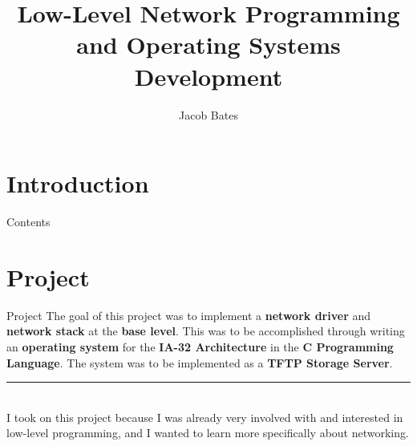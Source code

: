 \documentclass{beamer}
\title{Low-Level Network Programming and Operating Systems Development}
\author{Jacob Bates}
\institute{Da Vinci Science High School}
\begin{document}
\section{Introduction}

    \begin{frame}
        \titlepage
    \end{frame}

    \begin{frame}{Contents}
        \tableofcontents
    \end{frame}

\section{Project}

    \begin{frame}{Project}
        The goal of this project was to implement a \textbf{network driver} and \textbf{network stack} at the \textbf{base level}.
        This was to be accomplished through writing an \textbf{operating system} for the \textbf{IA-32 Architecture} in the \textbf{C Programming Language}.
        The system was to be implemented as a \textbf{TFTP Storage Server}.\\
        \rule{0.5\textwidth}{0.5pt}\\
        I took on this project because I was already very involved with and interested in low-level programming, and I wanted to learn more specifically about networking.
    \end{frame}
\end{document}
